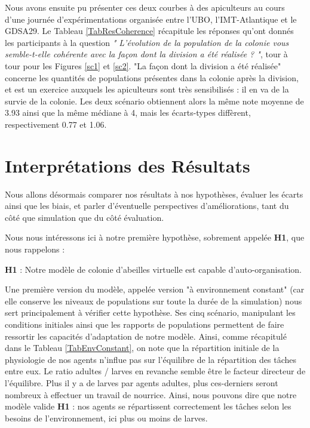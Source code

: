 	Nous avons ensuite pu présenter ces deux courbes à des apiculteurs au cours d'une journée d'expérimentations organisée entre l'UBO, l'IMT-Atlantique et le GDSA29. Le Tableau \ref{TabResCoherence} récapitule les réponses qu'ont donnés les participants à la question \textit{" L'évolution de la population de la colonie vous semble-t-elle cohérente avec la façon dont la division a été réalisée ? "}, tour à tour pour les Figures \ref{sc1} et \ref{sc2}. "La façon dont la division a été réalisée" concerne les quantités de populations présentes dans la colonie après la division, et est un exercice auxquels les apiculteurs sont très sensibilisés : il en va de la survie de la colonie. Les deux scénario obtiennent alors la même note moyenne de 3.93 ainsi que la même médiane à 4, mais les écarts-types diffèrent, respectivement 0.77 et 1.06.
	
	
	\section{Interprétations des Résultats}

	Nous allons désormais comparer nos résultats à nos hypothèses, évaluer les écarts ainsi que les biais, et parler d'éventuelle perspectives d'améliorations, tant du côté que simulation que du côté évaluation.	
	
		Nous nous intéressons ici à notre première hypothèse, sobrement appelée \textbf{H1}, que nous rappelons : 
		
		\textbf{H1} : Notre modèle de colonie d'abeilles virtuelle est capable d'auto-organisation.
		
		Une première version du modèle, appelée version "à environnement constant" (car elle conserve les niveaux de populations sur toute la durée de la simulation) nous sert principalement à vérifier cette hypothèse. Ses cinq scénario, manipulant les conditions initiales ainsi que les rapports de populations permettent de faire ressortir les capacités d'adaptation de notre modèle. Ainsi, comme récapitulé dans le Tableau \ref{TabEnvConstant}, on note que la répartition initiale de la physiologie de nos agents n'influe pas sur l'équilibre de la répartition des tâches entre eux. Le ratio adultes / larves en revanche semble être le facteur directeur de l'équilibre. Plus il y a de larves par agents adultes, plus ces-derniers seront nombreux à effectuer un travail de nourrice. Ainsi, nous pouvons dire que notre modèle valide \textbf{H1} : nos agents se répartissent correctement les tâches selon les besoins de l'environnement, ici plus ou moins de larves.
		
